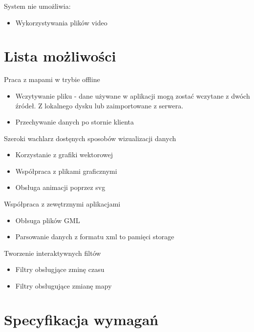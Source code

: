 System nie umożliwia:
\begin{itemize}
\item
Wykorzystywania plików video

\end{itemize}


\section{Lista możliwości}
\label{sec:listamozliwosci}

Praca z mapami w trybie offline
\begin{itemize}
\item
Wczytywanie pliku - dane używane w aplikacji mogą zostać wczytane z dwóch źródeł. Z lokalnego dysku lub zaimportowane z serwera.

\item
Przechywanie danych po stornie klienta

\end{itemize}

Szeroki wachlarz dostęnych sposobów wizualizacji danych
\begin{itemize}
\item
Korzystanie z grafiki wektorowej

\item
Współpraca z plikami graficznymi

\item
Obsługa animacji poprzez svg

\end{itemize}

Współpraca z zewętrznymi aplikacjami
\begin{itemize}
\item
Obłsuga plików GML

\item
Parsowanie danych z formatu xml to pamięci storage

\end{itemize}

Tworzenie interaktywnych filtów
\begin{itemize}
\item
Filtry obsługjące zminę czasu

\item
Filtry obsługujące zmianę mapy

\end{itemize}




\section{Specyfikacja wymagań}
\label{sec:specyfikacja wymagan}

